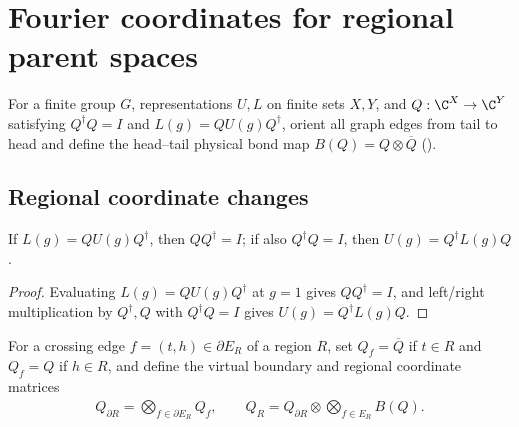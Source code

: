 \section{Fourier coordinates for regional parent spaces}
\label{sec:peps_fourier_parent_transport}

For a finite group $G$, representations $U,L$ on finite sets $X,Y$, and $Q:\C^X\to\C^Y$ satisfying $Q^\dagger Q=I$ and $L(g)=QU(g)Q^\dagger$, orient all graph edges from tail to head and define the head--tail physical bond map $B(Q)=Q\otimes\overline Q$ (\cite[Section~7]{Schuch2010PEPS}).

\subsection{Regional coordinate changes}

\begin{lemma}%
    \label{thm:peps_fourier_reverse_coordinates}
    \leanok
    If $L(g)=QU(g)Q^\dagger$, then $QQ^\dagger=I$; if also $Q^\dagger Q=I$, then $U(g)=Q^\dagger L(g)Q$.
\end{lemma}
\begin{proof}\leanok
    Evaluating $L(g)=QU(g)Q^\dagger$ at $g=1$ gives $QQ^\dagger=I$, and left/right multiplication by $Q^\dagger,Q$ with $Q^\dagger Q=I$ gives $U(g)=Q^\dagger L(g)Q$.
\end{proof}

\begin{definition}%
    \label{def:peps_fourier_regional_matrix}
    \leanok
    For a crossing edge $f=(t,h)\in\partial E_R$ of a region $R$, set $Q_f=\overline Q$ if $t\in R$ and $Q_f=Q$ if $h\in R$, and define the virtual boundary and regional coordinate matrices
    \begin{align}
        Q_{\partial R}=\bigotimes_{f\in\partial E_R}Q_f,\qquad
        Q_R=Q_{\partial R}\otimes\bigotimes_{f\in E_R}B(Q).
        \label{eq:peps_fourier_regional_matrix}
    \end{align}
\end{definition}

